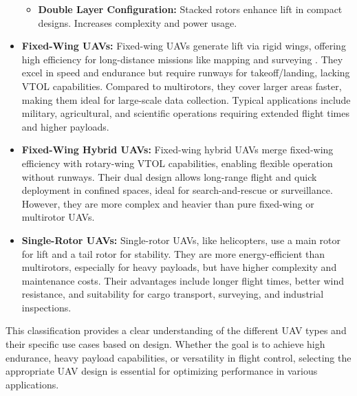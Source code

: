 \begin{itemize}
\begin{itemize}
    \item \textbf{Double Layer Configuration:} Stacked rotors enhance lift in compact designs. Increases complexity and power usage. \cite{idk}
\end{itemize}
    
    \item \textbf{Fixed-Wing UAVs:} Fixed-wing UAVs generate lift via rigid wings, offering high efficiency for long-distance missions like mapping and surveying \cite{ucgun2021uavcharging}. They excel in speed and endurance but require runways for takeoff/landing, lacking VTOL capabilities. Compared to multirotors, they cover larger areas faster, making them ideal for large-scale data collection. Typical applications include military, agricultural, and scientific operations requiring extended flight times and higher payloads.


    \item \textbf{Fixed-Wing Hybrid UAVs:} Fixed-wing hybrid UAVs merge fixed-wing efficiency with rotary-wing VTOL capabilities, enabling flexible operation without runways. Their dual design allows long-range flight and quick deployment in confined spaces, ideal for search-and-rescue or surveillance. However, they are more complex and heavier than pure fixed-wing or multirotor UAVs.

    \item \textbf{Single-Rotor UAVs:} Single-rotor UAVs, like helicopters, use a main rotor for lift and a tail rotor for stability. They are more energy-efficient than multirotors, especially for heavy payloads, but have higher complexity and maintenance costs. Their advantages include longer flight times, better wind resistance, and suitability for cargo transport, surveying, and industrial inspections.
    
\end{itemize}

This classification provides a clear understanding of the different UAV types and their specific use cases based on design. Whether the goal is to achieve high endurance, heavy payload capabilities, or versatility in flight control, selecting the appropriate UAV design is essential for optimizing performance in various applications.



